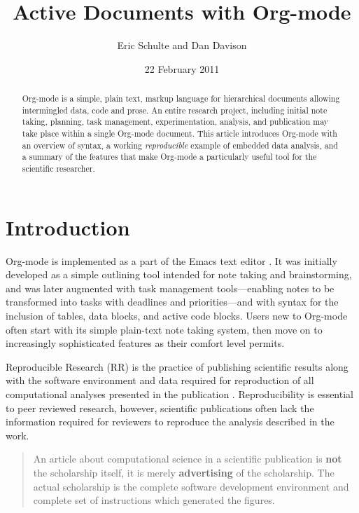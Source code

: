 \documentclass[11pt]{article}
\begin{document}
\title{Active Documents with Org-mode}
\author{Eric Schulte and Dan Davison}
\date{22 February 2011}
\maketitle


\begin{abstract}

  Org-mode is a simple, plain text, markup language for hierarchical
  documents allowing intermingled data, code and prose.  An entire
  research project, including initial note taking, planning, task
  management, experimentation, analysis, and publication may take
  place within a single Org-mode document.  This article introduces
  Org-mode with an overview of syntax, a working \emph{reproducible}
  example of embedded data analysis, and a summary of the features
  that make Org-mode a particularly useful tool for the scientific
  researcher.

\end{abstract}

\section{Introduction}
\label{sec-1}

Org-mode is implemented as a part of the Emacs text editor
\cite{emacs}.  It was initially developed as a simple outlining tool
intended for note taking and brainstorming, and was later augmented
with task management tools---enabling notes to be transformed into
tasks with deadlines and priorities---and with syntax for the
inclusion of tables, data blocks, and active code blocks.  Users new
to Org-mode often start with its simple plain-text note taking system,
then move on to increasingly sophisticated features as their comfort
level permits.

Reproducible Research (RR) is the practice of publishing scientific
results along with the software environment and data required for
reproduction of all computational analyses presented in the
publication \cite{cise-rr}.  Reproducibility is essential to peer
reviewed research, however, scientific publications often lack the
information required for reviewers to reproduce the analysis described
in the work.

\begin{quote}
An article about computational science in a scientific publication
is \textbf{not} the scholarship itself, it is merely \textbf{advertising} of the
scholarship.  The actual scholarship is the complete software
development environment and complete set of instructions which
generated the figures.

\end{quote}
\end{document}
